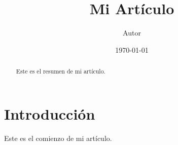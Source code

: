 \documentclass{revtex4-2}
\begin{document}
\title{Mi Artículo}
\author{Autor}
\date{\today}
\begin{abstract}
Este es el resumen de mi artículo.
\end{abstract}
\maketitle
\section{Introducción}
Este es el comienzo de mi artículo.
\end{document}
